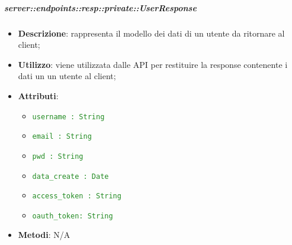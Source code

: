     \subparagraph{server::endpoints::resp::private::UserResponse} %
    \label{subp:bdsm_app_server_endpoints_resp_private_userresponse}
    \begin{itemize}
      \item \textbf{Descrizione}: rappresenta il modello dei dati di un utente da ritornare al client;
      \item \textbf{Utilizzo}: viene utilizzata dalle API per restituire la response contenente i dati un un utente al client;
    \item \textbf{Attributi}:
      \begin{itemize}
        \item \textcolor{forestgreen}{\texttt{username : String}}
        \item \textcolor{forestgreen}{\texttt{email : String}}
        \item \textcolor{forestgreen}{\texttt{pwd : String}}
        \item \textcolor{forestgreen}{\texttt{data\_create : Date}}
        \item \textcolor{forestgreen}{\texttt{access\_token : String}}
        \item \textcolor{forestgreen}{\texttt{oauth\_token: String}}
      \end{itemize}
    \item \textbf{Metodi}: N/A
    \end{itemize}

